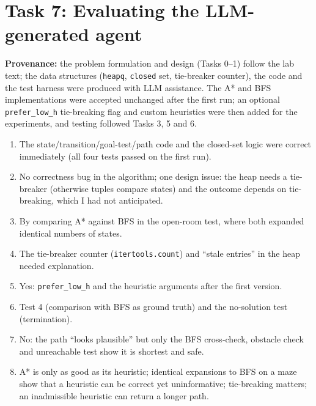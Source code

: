 \documentclass[10pt,a4paper]{article}
\begin{document}
\section*{Task 7: Evaluating the LLM-generated agent}
\textbf{Provenance:} the problem formulation and design (Tasks 0--1) follow the lab text; the data structures (\texttt{heapq}, \texttt{closed} set, tie-breaker counter), the code and the test harness were produced with LLM assistance. The A* and BFS implementations were accepted unchanged after the first run; an optional \texttt{prefer\_low\_h} tie-breaking flag and custom heuristics were then added for the experiments, and testing followed Tasks 3, 5 and 6.
\begin{enumerate}[leftmargin=*]
\item The state/transition/goal-test/path code and the closed-set logic were correct immediately (all four tests passed on the first run).
\item No correctness bug in the algorithm; one design issue: the heap needs a tie-breaker (otherwise tuples compare states) and the outcome depends on tie-breaking, which I had not anticipated.
\item By comparing A* against BFS in the open-room test, where both expanded identical numbers of states.
\item The tie-breaker counter (\texttt{itertools.count}) and ``stale entries'' in the heap needed explanation.
\item Yes: \texttt{prefer\_low\_h} and the heuristic arguments after the first version.
\item Test 4 (comparison with BFS as ground truth) and the no-solution test (termination).
\item No: the path ``looks plausible'' but only the BFS cross-check, obstacle check and unreachable test show it is shortest and safe.
\item A* is only as good as its heuristic; identical expansions to BFS on a maze show that a heuristic can be correct yet uninformative; tie-breaking matters; an inadmissible heuristic can return a longer path.
\end{enumerate}
\end{document}
